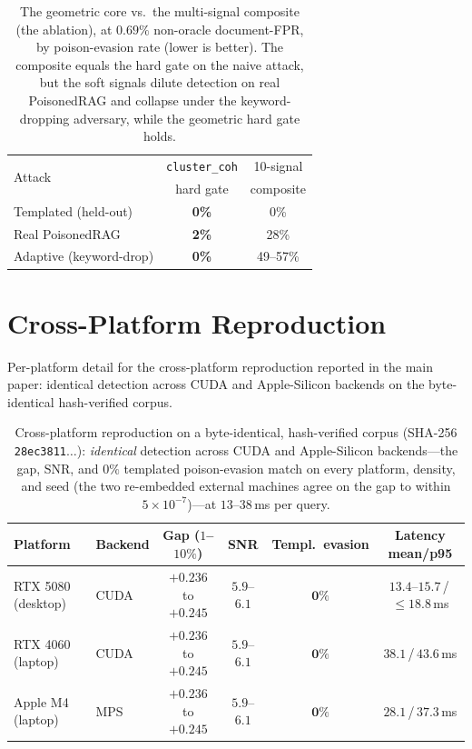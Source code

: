 \documentclass[conference]{IEEEtran}
\begin{document}
\begin{table}[htbp]
\centering
\caption{The geometric core vs.\ the multi-signal composite (the ablation), at
$0.69\%$ non-oracle document-FPR, by poison-evasion rate (lower is better). The
composite equals the hard gate on the naive attack, but the soft signals dilute
detection on real PoisonedRAG and collapse under the keyword-dropping adversary,
while the geometric hard gate holds.}
\label{tab:core}
\begin{tabular}{lcc}
\toprule
\multirow{2}{*}{Attack} & \texttt{cluster\_coh} & 10-signal \\
       & hard gate & composite \\
\midrule
Templated (held-out)    & \textbf{0\%} & 0\% \\
Real PoisonedRAG        & \textbf{2\%} & 28\% \\
Adaptive (keyword-drop) & \textbf{0\%} & 49--57\% \\
\bottomrule
\end{tabular}
\end{table}

\section{Cross-Platform Reproduction}
\label{app:xplat}
Per-platform detail for the cross-platform reproduction reported in the main paper: identical detection across CUDA and Apple-Silicon backends on the byte-identical hash-verified corpus.

\begin{table}[htbp]
\centering
\caption{Cross-platform reproduction on a byte-identical, hash-verified corpus (SHA-256
\texttt{28ec3811}$\dots$): \emph{identical} detection across CUDA and Apple-Silicon
backends---the gap, SNR, and $0\%$ templated poison-evasion match on every platform,
density, and seed (the two re-embedded external machines agree on the gap to within
$5\times10^{-7}$)---at $13$--$38$\,ms per query.}
\label{tab:xplat}
\begin{tabular}{llcccc}
\toprule
Platform & Backend & Gap ($1$--$10\%$) & SNR & Templ.\ evasion & Latency mean/p95 \\
\midrule
RTX 5080 (desktop) & CUDA & $+0.236$ to $+0.245$ & $5.9$--$6.1$ & $\mathbf{0\%}$ & $13.4$--$15.7$\,/\,$\le\!18.8$\,ms \\
RTX 4060 (laptop) & CUDA & $+0.236$ to $+0.245$ & $5.9$--$6.1$ & $\mathbf{0\%}$ & $38.1$\,/\,$43.6$\,ms \\
Apple M4 (laptop) & MPS & $+0.236$ to $+0.245$ & $5.9$--$6.1$ & $\mathbf{0\%}$ & $28.1$\,/\,$37.3$\,ms \\
\bottomrule
\end{tabular}
\end{table}
\end{document}
